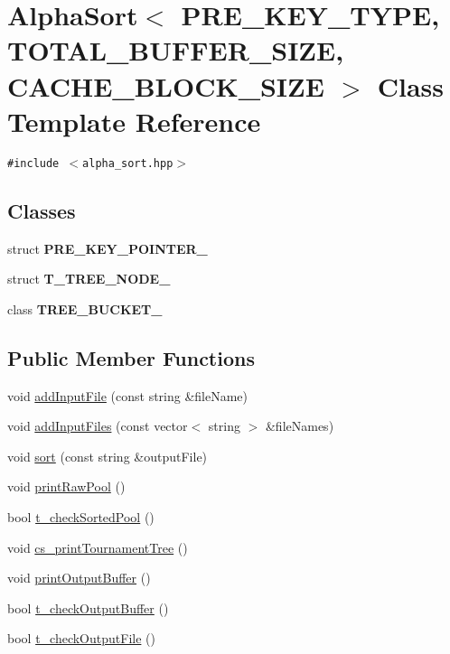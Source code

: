 \hypertarget{classAlphaSort}{
\section{AlphaSort$<$ PRE\_\-KEY\_\-TYPE, TOTAL\_\-BUFFER\_\-SIZE, CACHE\_\-BLOCK\_\-SIZE $>$ Class Template Reference}
\label{classAlphaSort}
}
{\tt \#include $<$alpha\_\-sort.hpp$>$}

\subsection*{Classes}
\begin{CompactItemize}
\item 
struct \textbf{PRE\_\-KEY\_\-POINTER\_\-}
\item 
struct \textbf{T\_\-TREE\_\-NODE\_\-}
\item 
class \textbf{TREE\_\-BUCKET\_\-}
\end{CompactItemize}
\subsection*{Public Member Functions}
\begin{CompactItemize}
\item 
void \hyperlink{classAlphaSort_7484f1a82e99c0f120e8fa3abaa23433}{addInputFile} (const string \&fileName)
\item 
void \hyperlink{classAlphaSort_25c8706bb2e9b9300551baa96d3114b0}{addInputFiles} (const vector$<$ string $>$ \&fileNames)
\item 
void \hyperlink{classAlphaSort_00bb46d99aec8fd91215f102811a1f0f}{sort} (const string \&outputFile)
\item 
void \hyperlink{classAlphaSort_70177f91c6fce0f8d8c7f832626c72a3}{printRawPool} ()
\item 
bool \hyperlink{classAlphaSort_e26e16f0a99aa238edbf9bacaf4d8eec}{t\_\-checkSortedPool} ()
\item 
void \hyperlink{classAlphaSort_5b973444db69202f66a633a5cfdf16e6}{cs\_\-printTournamentTree} ()
\item 
void \hyperlink{classAlphaSort_64e2cf8ecfa1f8b2fcd19430bda724ad}{printOutputBuffer} ()
\item 
bool \hyperlink{classAlphaSort_f1e2b4f06dec49fb43a73b98e2cccdde}{t\_\-checkOutputBuffer} ()
\item 
bool \hyperlink{classAlphaSort_406796e2994f09efa3c0ed24db7206a9}{t\_\-checkOutputFile} ()
\end{CompactItemize}
